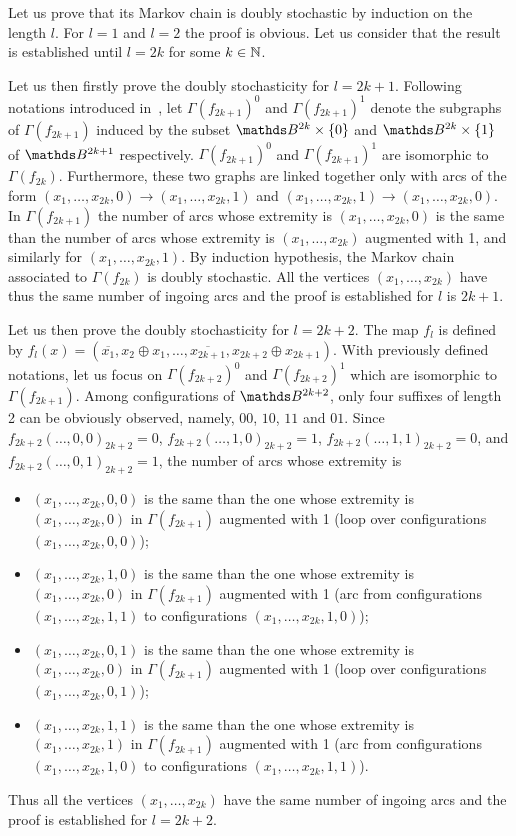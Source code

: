 \documentclass{comjnl}
\begin{document}
Let us prove that its Markov chain is doubly stochastic by induction on the 
length $l$.
For $l=1$ and $l=2$ the proof is obvious. Let us consider that the 
result is established until $l=2k$ for some $k \in \mathbb{N}$.

Let us then firstly prove the doubly stochasticity for $l=2k+1$.
Following notations introduced in~\cite{bcgr11:ip}, 
let  $\Gamma(f_{2k+1})^0$ and $\Gamma(f_{2k+1})^1$ denote
the subgraphs of $\Gamma(f_{2k+1})$ induced by the subset $\Bool^{2k} \times\{0\}$
and $\Bool^{2k} \times\{1\}$ of $\Bool^{2k+1}$ respectively.
$\Gamma(f_{2k+1})^0$ and   $\Gamma(f_{2k+1})^1$ are isomorphic to $\Gamma(f_{2k})$.
Furthermore, these two graphs are linked together only with arcs of the form
$(x_1,\dots,x_{2k},0) \to (x_1,\dots,x_{2k},1)$ and 
$(x_1,\dots,x_{2k},1) \to (x_1,\dots,x_{2k},0)$.
In $\Gamma(f_{2k+1})$ the number of arcs whose extremity is $(x_1,\dots,x_{2k},0)$
is  the same than the number of arcs whose extremity is $(x_1,\dots,x_{2k})$ 
augmented with 1, and similarly for $(x_1,\dots,x_{2k},1)$.
By induction hypothesis, the Markov chain associated to $\Gamma(f_{2k})$ is doubly stochastic. All the vertices $(x_1,\dots,x_{2k})$ have thus the same number of 
ingoing arcs and the proof is established for $l$ is $2k+1$.

Let us then  prove the doubly stochasticity for $l=2k+2$.
The map $f_l$ is defined by 
$f_l(x)= (\overline{x_1},x_2 \oplus x_{1},\dots,\overline{x_{2k+1}},x_{2k+2} \oplus x_{2k+1})$.
With previously defined  notations, let us focus on 
$\Gamma(f_{2k+2})^0$ and   $\Gamma(f_{2k+2})^1$ which are isomorphic to $\Gamma(f_{2k+1})$. 
Among configurations of $\Bool^{2k+2}$, only four suffixes of length 2 can be
obviously observed, namely, $00$, $10$, $11$ and $01$.
Since 
$f_{2k+2}(\dots,0,0)_{2k+2}=0$, $f_{2k+2}(\dots,1,0)_{2k+2}=1$, 
$f_{2k+2}(\dots,1,1)_{2k+2}=0$, and $f_{2k+2}(\dots,0,1)_{2k+2}=1$, the number of 
arcs whose extremity is 
\begin{itemize}
\item $(x_1,\dots,x_{2k},0,0)$
 is the same than the one whose extremity is $(x_1,\dots,x_{2k},0)$ in $\Gamma(f_{2k+1})$ augmented with 1 (loop over configurations $(x_1,\dots,x_{2k},0,0)$);
\item $(x_1,\dots,x_{2k},1,0)$
 is the same than the one whose extremity is $(x_1,\dots,x_{2k},0)$ in $\Gamma(f_{2k+1})$ augmented with 1 (arc from configurations 
$(x_1,\dots,x_{2k},1,1)$ to configurations 
$(x_1,\dots,x_{2k},1,0)$);
\item $(x_1,\dots,x_{2k},0,1)$
 is the same than the one whose extremity is $(x_1,\dots,x_{2k},0)$ in $\Gamma(f_{2k+1})$ augmented with 1 (loop over configurations $(x_1,\dots,x_{2k},0,1)$);
\item $(x_1,\dots,x_{2k},1,1)$
 is the same than the one whose extremity is $(x_1,\dots,x_{2k},1)$ in $\Gamma(f_{2k+1})$ augmented with 1 (arc from configurations 
$(x_1,\dots,x_{2k},1,0)$ to configurations 
$(x_1,\dots,x_{2k},1,1)$).
\end{itemize}
Thus all the vertices $(x_1,\dots,x_{2k})$ have  the same number of 
ingoing arcs and the proof is established for $l=2k+2$.
\end{document}
